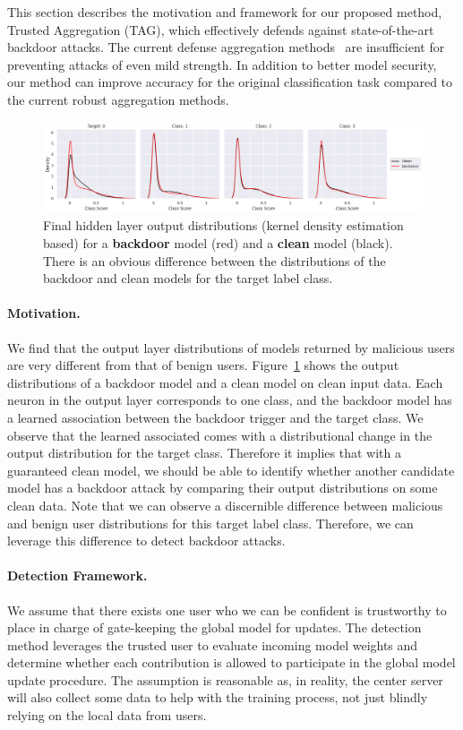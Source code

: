 \documentclass{article} %
\begin{document}
This section describes the motivation and framework for our proposed method, Trusted Aggregation (TAG), which effectively defends against state-of-the-art backdoor attacks. The current defense aggregation methods~\citep{fedavg,trim-mean} are insufficient for preventing attacks of even mild strength. In addition to better model security, our method can improve accuracy for the original classification task compared to the current robust aggregation methods.

\begin{figure}[htp]
    \centering
    \includegraphics[width=\textwidth]{make_article/make_visuals/visuals/ext_motivation.png}
    \caption{\footnotesize Final hidden layer output distributions (kernel density estimation based) for a {\color{red}\bf backdoor} model (red) and a {\bf clean} model (black). There is an obvious difference between the distributions of the backdoor and clean models for the target label class.}
    \label{fig: motivation}
\end{figure}

\paragraph{Motivation.} We find that the output layer distributions of models returned by malicious users are very different from that of benign users. Figure~\ref{fig: motivation} shows the output distributions of a backdoor model and a clean model on clean input data.  Each neuron in the output layer corresponds to one class, and the backdoor model has a learned association between the backdoor trigger and the target class. We observe that the learned associated comes with a distributional change in the output distribution for the target class. Therefore it implies that with a guaranteed clean model, we should be able to identify whether another candidate model has a backdoor attack by comparing their output distributions on some clean data.
Note that we can observe a discernible difference between malicious and benign user distributions for this target label class. Therefore, we can leverage this difference to detect backdoor attacks.

\paragraph{Detection Framework.}
We assume that there exists one user who we can be confident is trustworthy to place in charge of gate-keeping the global model for updates. The detection method leverages the trusted user to evaluate incoming model weights and determine whether each contribution is allowed to participate in the global model update procedure. The assumption is reasonable as, in reality, the center server will also collect some data to help with the training process, not just blindly relying on the local data from users.
\end{document}
